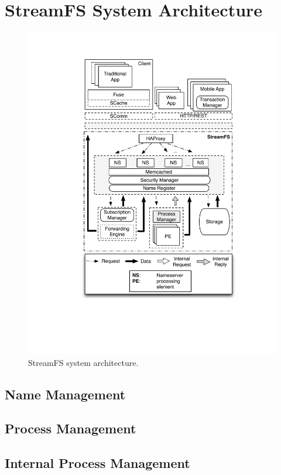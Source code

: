 \chapter{StreamFS System Architecture}

\begin{figure}[t!] %
\centering
\includegraphics[width=0.75\columnwidth]{figs/sfsarch}
\caption{StreamFS system architecture.}
\label{fig:sfsarch}
\end{figure}

\section{Name Management}



\section{Process Management}
%

\section{Internal Process Management}



